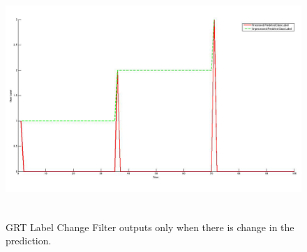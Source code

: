 \begin{figure}
	[h] \centering 
	\includegraphics[height=9cm]{figures/content/grt-label-change-filter.jpg} \caption{GRT Label Change Filter outputs only when there is change in the prediction. \cite{16}} \label{fg:grt:label:change} 
\end{figure}
